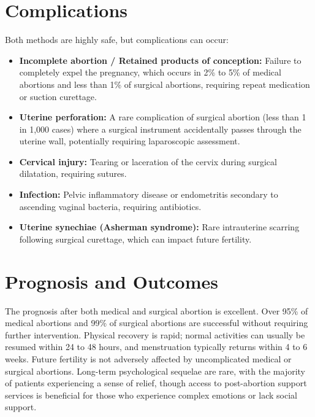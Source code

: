 \section*{Complications}
Both methods are highly safe, but complications can occur:
\begin{itemize}
    \item \textbf{Incomplete abortion / Retained products of conception:} Failure to completely expel the pregnancy, which occurs in 2\% to 5\% of medical abortions and less than 1\% of surgical abortions, requiring repeat medication or suction curettage.
    \item \textbf{Uterine perforation:} A rare complication of surgical abortion (less than 1 in 1,000 cases) where a surgical instrument accidentally passes through the uterine wall, potentially requiring laparoscopic assessment.
    \item \textbf{Cervical injury:} Tearing or laceration of the cervix during surgical dilatation, requiring sutures.
    \item \textbf{Infection:} Pelvic inflammatory disease or endometritis secondary to ascending vaginal bacteria, requiring antibiotics.
    \item \textbf{Uterine synechiae (Asherman syndrome):} Rare intrauterine scarring following surgical curettage, which can impact future fertility.
\end{itemize}

\section*{Prognosis and Outcomes}
The prognosis after both medical and surgical abortion is excellent. Over 95\% of medical abortions and 99\% of surgical abortions are successful without requiring further intervention. Physical recovery is rapid; normal activities can usually be resumed within 24 to 48 hours, and menstruation typically returns within 4 to 6 weeks. Future fertility is not adversely affected by uncomplicated medical or surgical abortions. Long-term psychological sequelae are rare, with the majority of patients experiencing a sense of relief, though access to post-abortion support services is beneficial for those who experience complex emotions or lack social support.

